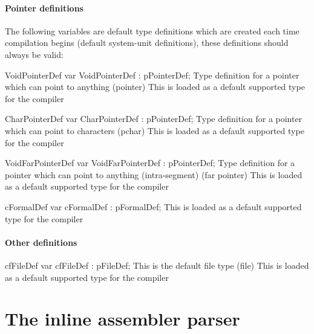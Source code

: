 \documentclass [12pt]{article}
\begin{document}
\clearpage 

\paragraph{Pointer definitions}

The following variables are default type definitions which are created each
time compilation begins (default system-unit definitions), these definitions
should always be valid:

\begin{variable}{VoidPointerDef}
\Declaration 
var VoidPointerDef : pPointerDef; 
\Description 
Type definition for a pointer which can point to anything (\textsf{pointer})
\Notes 
This is loaded as a default supported type for the compiler
\end{variable}

\begin{variable}{CharPointerDef}
\Declaration 
var CharPointerDef : pPointerDef; 
\Description 
Type definition for a pointer which can point to characters (\textsf{pchar})
\Notes 
This is loaded as a default supported type for the compiler
\end{variable}

\begin{variable}{VoidFarPointerDef}
\Declaration 
var VoidFarPointerDef : pPointerDef; 
\Description 
Type definition for a pointer which can point to anything 
(intra-segment) (\textsf{far pointer}) 
\Notes 
This is loaded as a default supported type for the compiler
\end{variable}

\begin{variable}{cFormalDef}
\Declaration 
var cFormalDef : pFormalDef; 
\Notes 
This is loaded as a default supported type for the compiler
\end{variable}

\paragraph{Other definitions}

\begin{variable}{cfFileDef}
\Declaration 
var cfFileDef : pFileDef; 
\Description This is the default file type (\textsf{file}) 
\Notes This is loaded as a default supported type for the compiler
\end{variable}

\section{The inline assembler parser}
\label{sec:mylabel6}
\end{document}
